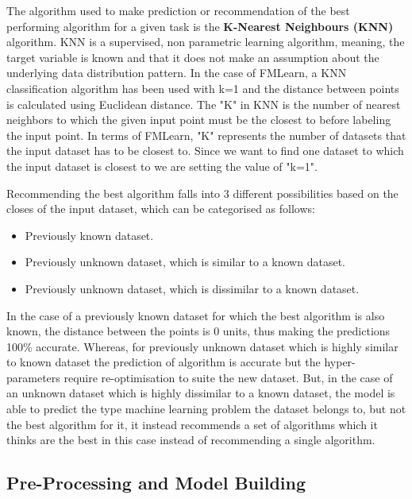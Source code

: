 The algorithm used to make prediction or recommendation of the best performing algorithm for a given task is the \textbf{K-Nearest Neighbours (KNN)} algorithm. KNN is a supervised, non parametric learning algorithm, meaning, the target variable is known and that it does not make an assumption about the underlying data distribution pattern. In the case of FMLearn, a KNN classification algorithm has been used with k=1 and the distance between points is calculated using Euclidean distance. The "K" in KNN is the number of nearest neighbors to which the given input point must be the closest to before labeling the input point. In terms of FMLearn, "K" represents the number of datasets that the input dataset has to be closest to. Since we want to find one dataset to which the input dataset is closest to we are setting the value of "k=1". 

Recommending the best algorithm falls into 3 different possibilities based on the closes of the input dataset, which can be categorised as follows:
\begin{itemize}
    \item Previously known dataset.
    \item Previously unknown dataset, which is similar to a known dataset.
    \item Previously unknown dataset, which is dissimilar to a known dataset.
\end{itemize}

 In the case of a previously known dataset for which the best algorithm is also known, the distance between the points is 0 units, thus making the predictions 100\% accurate. Whereas, for previously unknown dataset which is highly similar to known dataset the prediction of algorithm is accurate but the hyper-parameters require re-optimisation to suite the new dataset. But, in the case of an unknown dataset which is highly dissimilar to a known dataset, the model is able to predict the type machine learning problem the dataset belongs to, but not the best algorithm for it, it instead recommends a set of algorithms which it thinks are the best in this case instead of recommending a single algorithm.
   

\subsection{Pre-Processing and Model Building}
\label{model-building}

